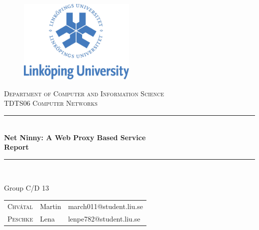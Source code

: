 \documentclass[12pt,a4paper]{article}
\begin{document}
	
\begin{titlepage}
\newcommand{\HRule}{\rule{\linewidth}{0.5mm}} %
\centering %
 
\begin{figure}[!h]
	\begin{center}
	\includegraphics[height=4cm]{liu.jpg}
	\end{center}
\end{figure}

\textsc{\large Department of Computer and Information Science}\\[0.5cm] %
\textsc{\large TDTS06 Computer Networks}\\[2.5cm] %


\HRule \\[0.4cm]
{ \LARGE \bfseries Net Ninny: A Web Proxy Based Service\\[0.4cm] %
\Large \bfseries Report} \\[0.4cm]

\HRule \\[1.5cm]



\large
\begin{centering}
Group C/D 13 \\[0.2cm]
\end{centering}
{\begin{tabular}{lll}
\textsc{Chvátal} & Martin & march011@student.liu.se\\
\textsc{Peschke} & Lena & lenpe782@student.liu.se\\
\end{tabular}}
\\[1.5cm]


\end{titlepage}
\end{document}
